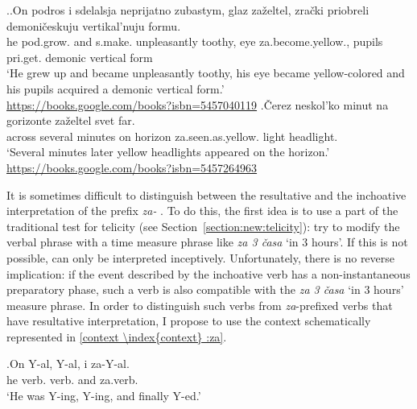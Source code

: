 \ex.\label{ex:zazeltet}\ag.\label{ex:zazeltet1}On podros i sdelalsja neprijatno zubastym, glaz za\v{z}eltel, zra\v{c}ki priobreli demoni\v{c}eskuju vertikal'nuju formu.\\
he pod.grow. and s.make. unpleasantly toothy, eye za.become.yellow., pupils pri.get. demonic vertical form\\
`He grew up and became unpleasantly toothy, his eye became yellow-colored and his pupils acquired a demonic vertical form.'\\\hbox{}\hfill\hbox{\url{https://books.google.com/books?isbn=5457040119}}
\bg.\label{ex:zazeltet2}\v{C}erez neskol'ko minut na gorizonte za\v{z}eltel svet far.\\
across several minutes on horizon za.seen.as.yellow. light headlight.\\
`Several minutes later yellow headlights appeared on the horizon.'\\\hbox{}\hfill\hbox{\url{https://books.google.com/books?isbn=5457264963}}

It is sometimes difficult to distinguish between the resultative  and the inchoative  interpretation of the prefix \textit{za-}  . To do this, the first idea is to use a part of the traditional test for telicity (see Section~\ref{section:new:telicity}): try to modify the verbal phrase with a time measure phrase  like \textit{za 3 \v{c}asa} `in 3 hours'. If this is not possible, can only be interpreted inceptively. Unfortunately, there is no reverse implication: if the event described by the inchoative  verb has a non-instantaneous preparatory phase, such a verb is also compatible with the \textit{za 3 \v{c}asa} `in 3 hours' measure phrase. In order to distinguish such verbs from \textit{za}-prefixed verbs that have resultative  interpretation, I propose to use the context   schematically represented in \ref{context \index{context} :za}.

\exg.\label{context \index{context} :za}On Y-al, Y-al, i za-Y-al.\\
he verb. verb. and za.verb.\\
\trans `He was Y-ing, Y-ing, and finally Y-ed.'

